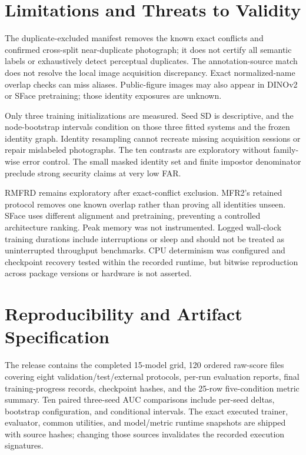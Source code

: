 \documentclass[10pt,journal,compsoc]{IEEEtran}
\begin{document}
\section{Limitations and Threats to Validity}
The duplicate-excluded manifest removes the known exact conflicts and confirmed cross-split near-duplicate photograph; it does not certify all semantic labels or exhaustively detect perceptual duplicates. The annotation-source match does not resolve the local image acquisition discrepancy. Exact normalized-name overlap checks can miss aliases. Public-figure images may also appear in DINOv2 or SFace pretraining; those identity exposures are unknown.

Only three training initializations are measured. Seed SD is descriptive, and the node-bootstrap intervals condition on those three fitted systems and the frozen identity graph. Identity resampling cannot recreate missing acquisition sessions or repair mislabeled photographs. The ten contrasts are exploratory without family-wise error control. The small masked identity set and finite impostor denominator preclude strong security claims at very low FAR.

RMFRD remains exploratory after exact-conflict exclusion. MFR2's retained protocol removes one known overlap rather than proving all identities unseen. SFace uses different alignment and pretraining, preventing a controlled architecture ranking. Peak memory was not instrumented. Logged wall-clock training durations include interruptions or sleep and should not be treated as uninterrupted throughput benchmarks. CPU determinism was configured and checkpoint recovery tested within the recorded runtime, but bitwise reproduction across package versions or hardware is not asserted.

\section{Reproducibility and Artifact Specification}
The release contains the completed 15-model grid, 120 ordered raw-score files covering eight validation/test/external protocols, per-run evaluation reports, final training-progress records, checkpoint hashes, and the 25-row five-condition metric summary. Ten paired three-seed AUC comparisons include per-seed deltas, bootstrap configuration, and conditional intervals. The exact executed trainer, evaluator, common utilities, and model/metric runtime snapshots are shipped with source hashes; changing those sources invalidates the recorded execution signatures.
\end{document}
